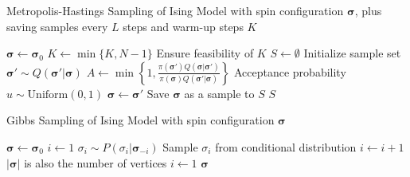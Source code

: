 \documentclass{article}
\begin{document}
\begin{algorithm}
    \caption{Metropolis-Hastings Sampling of Ising Model with spin configuration $\boldsymbol{\sigma}$, plus saving samples every $L$ steps and warm-up steps $K$}
\begin{algorithmic}[1]
    \State $\boldsymbol\sigma \gets \boldsymbol\sigma_0$
    \State $K \gets \min\{K, N - 1\}$ \Comment Ensure feasibility of $K$
    \State $S\gets \emptyset$ \Comment Initialize sample set
    \State $\boldsymbol\sigma' \sim Q(\boldsymbol\sigma'|\boldsymbol\sigma)$
    \State $A\gets \min\left\{1, \frac{\pi(\boldsymbol\sigma')Q(\boldsymbol\sigma|\boldsymbol\sigma')}{\pi(\boldsymbol\sigma)Q(\boldsymbol\sigma'|\boldsymbol\sigma)}\right\}$ \Comment Acceptance probability
    \State $u \sim \mathrm{Uniform}(0,1)$
    \State $\boldsymbol\sigma \gets \boldsymbol\sigma'$
    \EndIf
    \State Save $\boldsymbol\sigma$ as a sample to $S$
    \EndIf
    \EndFor
    \State \Return $S$
    \EndFunction
\end{algorithmic}
\end{algorithm}
\begin{algorithm}
    \caption{Gibbs Sampling of Ising Model with spin configuration $\boldsymbol{\sigma}$}
\begin{algorithmic}[1]
    \State $\boldsymbol\sigma \gets \boldsymbol\sigma_0$
    \State $i \gets 1$
    \State $\sigma_i \sim P(\sigma_i|\boldsymbol\sigma_{-i})$ \Comment Sample $\sigma_i$ from conditional distribution
    \State $i \gets i + 1$
     \Comment $|\boldsymbol\sigma|$ is also the number of vertices
    \State $i \gets 1$
    \EndIf
    \EndFor
    \State \Return $\boldsymbol\sigma$
    \EndFunction
\end{algorithmic}
\end{algorithm}
\end{document}
